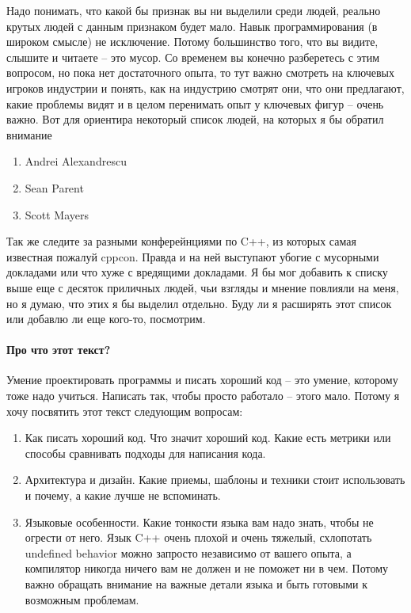 Надо понимать, что какой бы признак вы ни выделили среди людей, реально крутых людей с данным признаком будет мало.
Навык программирования (в широком смысле) не исключение.
Потому большинство того, что вы видите, слышите и читаете -- это мусор.
Со временем вы конечно разберетесь с этим вопросом, но пока нет достаточного опыта, то тут важно смотреть на ключевых игроков индустрии и понять, как на индустрию смотрят они, что они предлагают, какие проблемы видят и в целом перенимать опыт у ключевых фигур -- очень важно.
Вот для ориентира некоторый список людей, на которых я бы обратил внимание
\begin{enumerate}
\item Andrei Alexandrescu

\item Sean Parent

\item Scott Mayers
\end{enumerate}
Так же следите за разными конферейнциями по C++, из которых самая известная пожалуй cppcon.
Правда и на ней выступают убогие с мусорными докладами или что хуже с вредящими докладами.
Я бы мог добавить к списку выше еще с десяток приличных людей, чьи взгляды и мнение повлияли на меня, но я думаю, что этих я бы выделил отдельно.
Буду ли я расширять этот список или добавлю ли еще кого-то, посмотрим.

\paragraph{Про что этот текст?}

Умение проектировать программы и писать хороший код -- это умение, которому тоже надо учиться.
Написать так, чтобы просто работало -- этого мало.
Потому я хочу посвятить этот текст следующим вопросам:
\begin{enumerate}
\item Как писать хороший код.
Что значит хороший код.
Какие есть метрики или способы сравнивать подходы для написания кода.

\item Архитектура и дизайн.
Какие приемы, шаблоны и техники стоит использовать и почему, а какие лучше не вспоминать.

\item Языковые особенности.
Какие тонкости языка вам надо знать, чтобы не огрести от него.
Язык C++ очень плохой и очень тяжелый, схлопотать undefined behavior можно запросто независимо от вашего опыта, а компилятор никогда ничего вам не должен и не поможет ни в чем.
Потому важно обращать внимание на важные детали языка и быть готовыми к возможным проблемам.
\end{enumerate}

